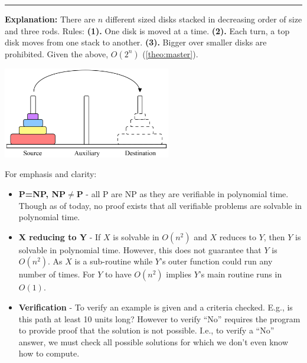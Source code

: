 \begin{Func}

    \label{TowersOfHanoi}
    \vspace{-.5em}
    \begin{algorithm}[H]
        \SetAlgoLined
    \end{algorithm}
    \noindent
    \rule{\textwidth}{0.4pt}
    \textbf{Explanation:} There are $n$ different sized disks stacked in decreasing order of size and three rods. Rules:
    \textbf{(1).} One disk is moved at a time. \textbf{(2).} Each turn, a top disk moves from one stack to another. \textbf{(3).} Bigger over smaller disks are prohibited.
    Given the above, $O(2^n)$ (\ref{theo:master}).
    \begin{center}
        \includegraphics[width=0.55\textwidth]{Sections/hard/hanoi.png}
    \end{center}
    
\end{Func}

\newpage 

\noindent
For emphasis and clarity:
\begin{theo}

    \begin{itemize}
        \item \textbf{P=NP, NP$\neq$P} - all P are NP as they are verifiable in polynomial time. Though as of today, no proof exists that all verifiable problems are solvable in polynomial time.
        \item \textbf{X reducing to Y} - If $X$ is solvable in $O(n^2)$ and $X$ reduces to $Y$, then $Y$ is solvable in polynomial time. However, 
        this does not guarantee that $Y$ is $O(n^2)$. As $X$ is a sub-routine while $Y$'s outer function could run any number of times. For $Y$ to have $O(n^2)$ implies 
        $Y$'s main routine runs in $O(1)$.
        \item \textbf{Verification} - To verify an example is given and a criteria checked. E.g., is this path at least 10 units long?
        However to verify ``No'' requires the program to provide proof that the solution is not possible. I.e., to verify a ``No'' answer, we must check all possible solutions for which 
        we don't even know how to compute.
    \end{itemize}
\end{theo}

